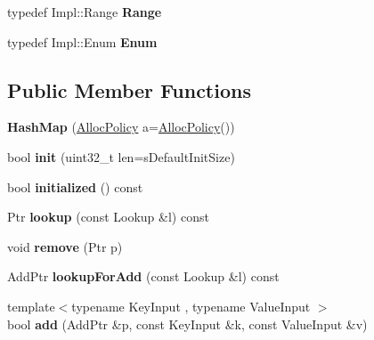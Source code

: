\begin{DoxyCompactItemize}
\item 
\hypertarget{classjs_1_1_hash_map_ab46363f19526ec43155369132bd0a010}{typedef Impl\-::\-Range {\bfseries Range}}\label{classjs_1_1_hash_map_ab46363f19526ec43155369132bd0a010}

\item 
\hypertarget{classjs_1_1_hash_map_ad819d1c1f0dc803f44f6ee6d8046e6ba}{typedef Impl\-::\-Enum {\bfseries Enum}}\label{classjs_1_1_hash_map_ad819d1c1f0dc803f44f6ee6d8046e6ba}

\end{DoxyCompactItemize}
\subsection*{Public Member Functions}
\begin{DoxyCompactItemize}
\item 
\hypertarget{classjs_1_1_hash_map_a92d212f4d36a44c789986050761e12e3}{{\bfseries Hash\-Map} (\hyperlink{class_alloc_policy}{Alloc\-Policy} a=\hyperlink{class_alloc_policy}{Alloc\-Policy}())}\label{classjs_1_1_hash_map_a92d212f4d36a44c789986050761e12e3}

\item 
\hypertarget{classjs_1_1_hash_map_afbbb312c85f13999f00a6fca76f1bc87}{bool {\bfseries init} (uint32\-\_\-t len=s\-Default\-Init\-Size)}\label{classjs_1_1_hash_map_afbbb312c85f13999f00a6fca76f1bc87}

\item 
\hypertarget{classjs_1_1_hash_map_add0f44f7a989e9ec8e317928813b7ff8}{bool {\bfseries initialized} () const }\label{classjs_1_1_hash_map_add0f44f7a989e9ec8e317928813b7ff8}

\item 
\hypertarget{classjs_1_1_hash_map_a906f95025b153843ea72a4c281288943}{Ptr {\bfseries lookup} (const Lookup \&l) const }\label{classjs_1_1_hash_map_a906f95025b153843ea72a4c281288943}

\item 
\hypertarget{classjs_1_1_hash_map_a785bcb08a6494bcf2548887e66ccadea}{void {\bfseries remove} (Ptr p)}\label{classjs_1_1_hash_map_a785bcb08a6494bcf2548887e66ccadea}

\item 
\hypertarget{classjs_1_1_hash_map_af280342c01e2321afc83dd353e78f2a4}{Add\-Ptr {\bfseries lookup\-For\-Add} (const Lookup \&l) const }\label{classjs_1_1_hash_map_af280342c01e2321afc83dd353e78f2a4}

\item 
\hypertarget{classjs_1_1_hash_map_a7551b1a959123ad30bc4a28e44915848}{{\footnotesize template$<$typename Key\-Input , typename Value\-Input $>$ }\\bool {\bfseries add} (Add\-Ptr \&p, const Key\-Input \&k, const Value\-Input \&v)}\label{classjs_1_1_hash_map_a7551b1a959123ad30bc4a28e44915848}


\end{DoxyCompactItemize}
